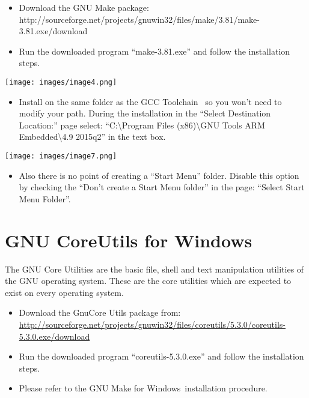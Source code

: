 \begin{itemize}
\tightlist
\item
  {Download the GNU Make package:
  http://sourceforge.net/projects/gnuwin32/files/make/3.81/make-3.81.exe/download}
\item
  {Run the downloaded program ``make-3.81.exe'' and follow the
  installation steps. }
\end{itemize}

{\texttt{[image: images/image4.png]}}

\begin{itemize}
\tightlist
\item
  {Install on the same folder as the GCC Toolchain ~so you won't need to
  modify your path. During the installation in the ``Select Destination
  Location:'' page select: ``C:\textbackslash{}Program Files
  (x86)\textbackslash{}GNU Tools ARM Embedded\textbackslash{}4.9
  2015q2'' in the text box.}
\end{itemize}

{\texttt{[image: images/image7.png]}}

\begin{itemize}
\tightlist
\item
  {Also there is no point of creating a ``Start Menu'' folder. Disable
  this option by checking the ``Don't create a Start Menu folder'' in
  the page: ``Select Start Menu Folder''. }
\end{itemize}

\hypertarget{h.3znysh7}{\section{\texorpdfstring{{GNU CoreUtils for
Windows}}{GNU CoreUtils for Windows}}\label{h.3znysh7}}

{The GNU Core Utilities are the basic file, shell and text manipulation
utilities of the GNU operating system. These are the core utilities
which are expected to exist on every operating system.}

\begin{itemize}
\tightlist
\item
  {Download the GnuCore Utils package from:
  }{\href{https://www.google.com/url?q=http://sourceforge.net/projects/gnuwin32/files/coreutils/5.3.0/coreutils-5.3.0.exe/download\&sa=D\&ust=1511275046372000\&usg=AFQjCNEiYiOPmJnrJ9jTIPo2YGpR3Yz9wg}{http://sourceforge.net/projects/gnuwin32/files/coreutils/5.3.0/coreutils-5.3.0.exe/download}}
\item
  {Run the downloaded program ``coreutils-5.3.0.exe'' and follow the
  installation steps.}
\item
  {Please refer to the }{GNU Make for Windows}{~installation procedure.}
\end{itemize}

